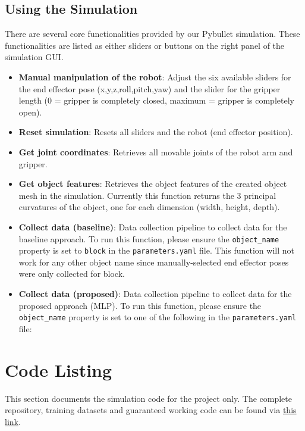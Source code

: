 \documentclass[11pt, a4paper]{report}
\begin{document}
\section{Using the Simulation}\label{apdx:2.3}
There are several core functionalities provided by our Pybullet simulation. These functionalities are listed as either sliders or buttons on the right panel of the simulation GUI.
\begin{itemize}
    \item \textbf{Manual manipulation of the robot}: Adjust the six available sliders for the end effector pose (x,y,z,roll,pitch,yaw) and the slider for the gripper length (0 = gripper is completely closed, maximum = gripper is completely open).
    \item \textbf{Reset simulation}: Resets all sliders and the robot (end effector position).
    \item \textbf{Get joint coordinates}: Retrieves all movable joints of the robot arm and gripper.
    \item \textbf{Get object features}: Retrieves the object features of the created object mesh in the simulation. Currently this function returns the 3 principal curvatures of the object, one for each dimension (width, height, depth).
    \item \textbf{Collect data (baseline)}: Data collection pipeline to collect data for the baseline approach. To run this function, please ensure the \verb|object_name| property is set to \verb|block| in the \verb|parameters.yaml| file. This function will not work for any other object name since manually-selected end effector poses were only collected for block.
    \item \textbf{Collect data (proposed)}: Data collection pipeline to collect data for the proposed approach (MLP). To run this function, please ensure the \verb|object_name| property is set to one of the following in the \verb|parameters.yaml| file:
\end{itemize}


\chapter{Code Listing}\label{apdx:3}
This section documents the simulation code for the project only. The complete repository, training datasets and guaranteed working code can be found via \hyperref[]{this link}.
\end{document}
